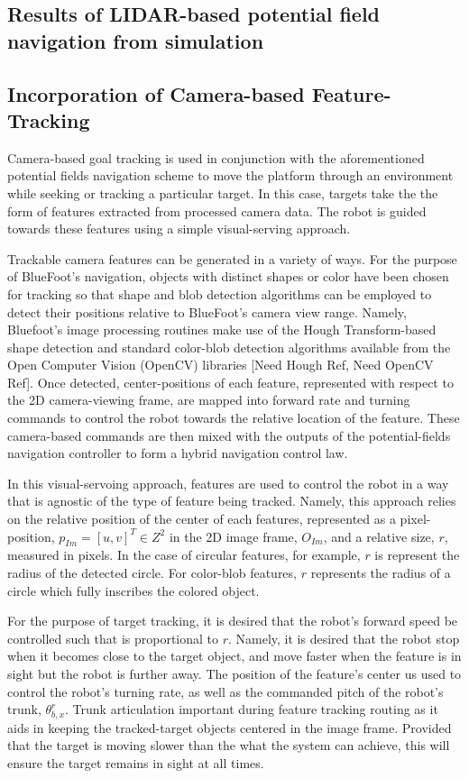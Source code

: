 		\subsection{Results of LIDAR-based potential field navigation from simulation}


		\subsection{Incorporation of Camera-based Feature-Tracking}
		
		Camera-based goal tracking is used in conjunction with the aforementioned potential fields navigation scheme to move the platform through an environment while seeking or tracking a particular target. In this case, targets take the the form of features extracted from processed camera data. The robot is guided towards these features using a simple visual-serving approach. 

Trackable camera features can be generated in a variety of ways. For the purpose of BlueFoot's navigation, objects with distinct shapes or color have been chosen for tracking so that shape and blob detection algorithms can be employed to detect their positions relative to BlueFoot's camera view range. Namely, Bluefoot's image processing routines make use of the Hough Transform-based shape detection and standard color-blob detection algorithms available from the Open Computer Vision (OpenCV) libraries [Need Hough Ref, Need OpenCV Ref]. Once detected, center-positions of each feature, represented with respect to the 2D camera-viewing frame, are mapped into forward rate and turning commands to control the robot towards the relative location of the feature. These camera-based commands are then mixed with the outputs of the potential-fields navigation controller to form a hybrid navigation control law.

In this visual-servoing approach, features are used to control the robot in a way that is agnostic of the type of feature being tracked. Namely, this approach relies on the relative position of the center of each features, represented as a pixel-position, $p_{Im} = [u,v]^{T} \in Z^{2}$ in the 2D image frame, $O_{Im}$, and a relative size, $r$, measured in pixels. In the case of circular features, for example, $r$ is represent the radius of the detected circle. For color-blob features, $r$ represents the radius of a circle which fully inscribes the colored object.

For the purpose of target tracking, it is desired that the robot's forward speed be controlled such that is proportional to $r$. Namely, it is desired that the robot stop when it becomes close to the target object, and move faster when the feature is in sight but the robot is further away. The position of the feature's center us used to control the robot's turning rate, as well as the commanded pitch of the robot's trunk, $\theta_{b,x}^{r}$. Trunk articulation important during feature tracking routing as it aids in keeping the tracked-target objects centered in the image frame. Provided that the target is moving slower than the what the system can achieve, this will ensure the target remains in sight at all times.

